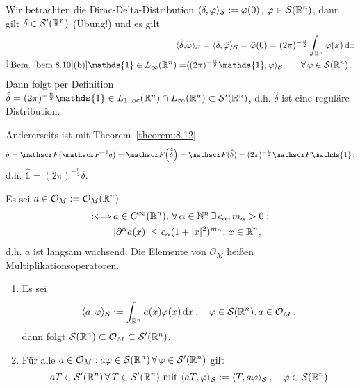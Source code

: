 \begin{bsp}
  \label{bsp:8.13}
  Wir betrachten die Dirac-Delta-Distribution $\langle\delta, \varphi\rangle_{\mathcal S} := \varphi (0)$, $\varphi \in \mathcal S(\mathbb{R}^n)$, dann gilt $\delta \in \mathcal S'(\mathbb{R}^n)$ (Übung!) und es gilt
  \begin{align*}
  	\< \hat\delta, &\varphi \>_{\mathcal S}  = \< \delta, \hat\varphi\>_{\mathcal S} =\hat\varphi (0) = (2\pi)^{-\frac n2} \int_{\R^n} \varphi(x) \d x \\
	 \stackrel[\scriptsize\text{Bem.}~\ref{bem:8.10} \text{(b)}]{\mathds{1}\in L_\infty (\R^n)}= & \< (2\pi)^{-\frac n2} \mathds{1}, \varphi\>_{\mathcal S} \qquad \fa \, \varphi \in \mathcal S(\R^n) \,.
  \end{align*}
  Dann folgt per Definition $\hat\delta = (2\pi)^{-\frac n2} \mathds{1} \in \Lloc (\R^n) \cap L_\infty (\R^n) \subset \mathcal S'(\R^n)$, d.h. $\hat\delta$ ist eine reguläre Distribution.
  
  Andererseits ist mit Theorem~\ref{theorem:8.12}
  \begin{align*}
  	\delta = \F (\F^{-1} \delta) = \F\Big( \hat{\breve\delta}\Big) = \F(\hat\delta) = (2\pi)^{-\frac n2} \F \mathds{1} \, , 
  \end{align*}
  d.h. $\hat{\mathds{1}} = (2\pi)^{-\frac n2}\delta$.
\end{bsp}

\begin{defi}
Es sei $a \in \mathcal O_M := \mathcal O_M(\mathbb{R}^n)$
\begin{align*}
	:\Longleftrightarrow \, & a \in C^\infty (\mathbb{R}^n), \, \forall \, \alpha\in\mathbb{N}^n \, \exists \, c_\alpha, m_\alpha > 0: \\ & \lvert \partial^\alpha a(x)\rvert \leq c_\alpha (1+\lvert x\rvert^2)^{m_\alpha} , \, x \in \mathbb{R}^n, 
\end{align*}
d.h. $a$ ist langsam wachsend. Die Elemente von $\mathcal O_M$ heißen Multiplikationsoperatoren.
\end{defi}

\begin{satz}\label{satz:8.14}
\begin{enumerate}[\rm(a)]
\item Es sei
\[
	\langle a, \varphi\rangle_{\mathcal S} := \int_{\mathbb{R}^n} a(x) \varphi(x) \,\mathrm{d} x \, , \quad \varphi \in \mathcal S(\mathbb{R}^n), a \in \mathcal O_M \, ,
\]
dann folgt $\mathcal S(\mathbb{R}^n) \subset \mathcal O_M \subset \mathcal S'(\mathbb{R}^n)$.
\item Für alle $a \in \mathcal O_M: a \varphi \in \mathcal S(\mathbb{R}^n) \, \forall \, \varphi \in\mathcal S'(\mathbb{R}^n)$ gilt
\[
	aT \in \mathcal S'(\mathbb{R}^n) \, \forall \, T \in \mathcal S'(\mathbb{R}^n) \text{ mit } \langle aT,\varphi\rangle_{\mathcal S} := \langle T,a\varphi \rangle_{\mathcal S} \, , \quad \varphi \in \mathcal S(\mathbb{R}^n)
\]
\end{enumerate}
\end{satz}

